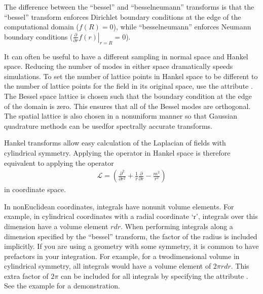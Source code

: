 \documentclass[letterpaper,10pt,english]{sphinxmanual}
\begin{document}
\ignorespaces 
\sphinxAtStartPar
The difference between the “bessel” and “bessel\sphinxhyphen{}neumann” transforms is that the “bessel” transform enforces Dirichlet boundary conditions at the edge of the computational domain (\(f(R) = 0\)), while “bessel\sphinxhyphen{}neumann” enforces Neumann boundary conditions (\(\left.\frac{\partial}{\partial r}f(r) \right|_{r=R} = 0\)).

\sphinxAtStartPar
It can often be useful to have a different sampling in normal space and Hankel space.  Reducing the number of modes in either space dramatically speeds simulations.  To set the number of lattice points in Hankel space to be different to the number of lattice points for the field in its original space, use the attribute .  The Bessel space lattice is chosen such that the boundary condition at the edge of the domain is zero.  This ensures that all of the Bessel modes are orthogonal.  The spatial lattice is also chosen in a non\sphinxhyphen{}uniform manner so that Gaussian quadrature methods can be usedfor spectrally accurate transforms.

\sphinxAtStartPar
Hankel transforms allow easy calculation of the Laplacian of fields with cylindrical symmetry.  Applying the operator  in Hankel space is therefore equivalent to applying the operator
\begin{equation*}
\begin{split}\mathcal{L} = \left(\frac{\partial^2}{\partial r^2} +\frac{1}{r}\frac{\partial}{\partial r} -\frac{m^2}{r^2} \right)\end{split}
\end{equation*}
\sphinxAtStartPar
in coordinate space.

\sphinxAtStartPar
In non\sphinxhyphen{}Euclidean co\sphinxhyphen{}ordinates, integrals have non\sphinxhyphen{}unit volume elements.  For example, in cylindrical co\sphinxhyphen{}ordinates with a radial co\sphinxhyphen{}ordinate ‘r’, integrals over this dimension have a volume element \(r dr\).  When performing integrals along a dimension specified by the “bessel” transform, the factor of the radius is included implicitly.  If you are using a geometry with some symmetry, it is common to have prefactors in your integration.  For example, for a two\sphinxhyphen{}dimensional volume in cylindrical symmetry, all integrals would have a volume element of \(2\pi r dr\).  This extra factor of \(2 \pi\) can be included for all integrals by specifying the attribute .  See the example  for a demonstration.
\end{document}
